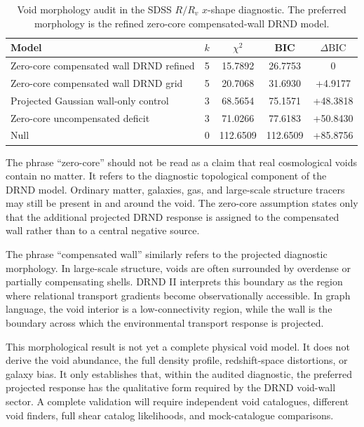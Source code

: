 \documentclass[12pt]{iopart}
\begin{document}
\begin{table}[htbp]
\caption{Void morphology audit in the SDSS \(R/R_v\) \(x\)-shape diagnostic. The preferred morphology is the refined zero-core compensated-wall DRND model.}
\label{tab:void_morphology_bic}
\begin{center}
\small
\begin{tabular}{lcccc}
\hline
\textbf{Model} & \(k\) & \(\chi^2\) & \textbf{BIC} & \(\Delta\mathrm{BIC}\) \\
\hline
Zero-core compensated wall DRND refined & 5 & 15.7892 & 26.7753 & 0 \\
Zero-core compensated wall DRND grid & 5 & 20.7068 & 31.6930 & +4.9177 \\
Projected Gaussian wall-only control & 3 & 68.5654 & 75.1571 & +48.3818 \\
Zero-core uncompensated deficit & 3 & 71.0266 & 77.6183 & +50.8430 \\
Null & 0 & 112.6509 & 112.6509 & +85.8756 \\
\hline
\end{tabular}
\end{center}
\end{table}

The phrase ``zero-core'' should not be read as a claim that real cosmological voids contain no matter. It refers to the diagnostic topological component of the DRND model. Ordinary matter, galaxies, gas, and large-scale structure tracers may still be present in and around the void. The zero-core assumption states only that the additional projected DRND response is assigned to the compensated wall rather than to a central negative source.

The phrase ``compensated wall'' similarly refers to the projected diagnostic morphology. In large-scale structure, voids are often surrounded by overdense or partially compensating shells. DRND II interprets this boundary as the region where relational transport gradients become observationally accessible. In graph language, the void interior is a low-connectivity region, while the wall is the boundary across which the environmental transport response is projected.

This morphological result is not yet a complete physical void model. It does not derive the void abundance, the full density profile, redshift-space distortions, or galaxy bias. It only establishes that, within the audited diagnostic, the preferred projected response has the qualitative form required by the DRND void-wall sector. A complete validation will require independent void catalogues, different void finders, full shear catalog likelihoods, and mock-catalogue comparisons.
\end{document}
